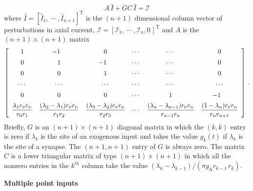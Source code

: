 \begin{equation}\label{syn18}
A\,\widehat{I}+GC\,\widehat{I}=\mathcal{I}
\end{equation}
where $\widehat{I}=[\widehat{I}_1,\ \cdots\ ,\widehat{I}_{n+1}
]^\mathrm{T}$ is the $(n+1)$ dimensional column vector of
perturbations in axial current, $\mathcal{I}=[\mathcal{I}_1,\
\cdots\ , \mathcal{I}_n,0\,]^\mathrm{T}$ and $A$ is the
$(n+1)\times(n+1)$ matrix
\begin{equation}\label{syn19}
\left[\begin{array}{ccccccc}
1 & \hskip-9pt-1 &  0 & \cdots & \cdots & 0 \\[5pt]
0 &  1 & \hskip-9pt-1 & \cdots & \cdots & 0 \\[5pt]
0 &  0 &  1 & \cdots & \cdots & 0 \\[5pt]
\cdots & \cdots & \cdots & \cdots & \cdots & \cdots \\[5pt]
0 & 0 & 0 & \cdots & 1 & \hskip-9pt-1 \\[5pt]
\ds\frac{\lambda_1 r_\mathrm{P}r_\mathrm{D}}{r_0 r_1} &
\ds\frac{(\lambda_2-\lambda_1)r_\mathrm{P}r_\mathrm{D}}{r_1 r_2} &
\ds\frac{(\lambda_3-\lambda_2)r_\mathrm{P}r_\mathrm{D}}{r_2 r_3} &
\cdots &
\ds\frac{(\lambda_n-\lambda_{n-1})r_\mathrm{P}r_\mathrm{D}}{r_{n-1}
r_n} & \ds\frac{(1-\lambda_n)r_\mathrm{P}r_\mathrm{D}} {r_n
r_{n+1}}
\end{array}\right]\,.
\end{equation}
Briefly, $G$ is an $(n+1)\times(n+1)$ diagonal matrix in which the
$(k,k)$ entry is zero if $\lambda_k$ is the site of an exogenous
input and takes the value $g_k(t)$ if $\lambda_k$ is the site of a
synapse. The $(n+1,n+1)$ entry of $G$ is always zero. The matrix
$C$ is a lower triangular matrix of type $(n+1)\times(n+1)$ in
which all the nonzero entries in the $k^{th}$ column take the
value $(\lambda_k-\lambda_{k-1})/(\pi g_\mathrm{A}r_{k-1}\,r_k)$.

\textbf{Multiple point inputs}

